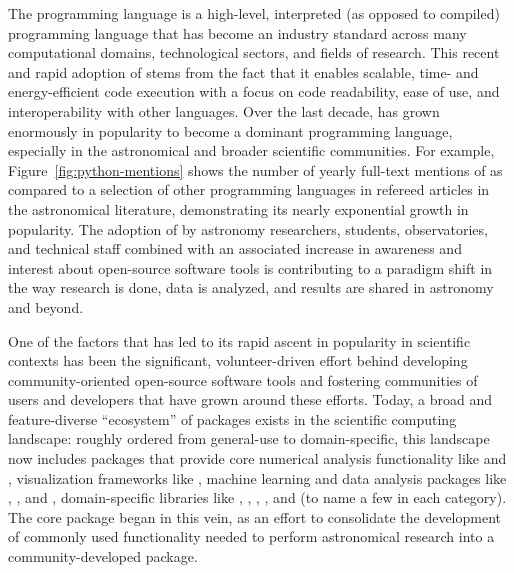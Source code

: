 \documentclass[modern]{aastex631}
\newcommand{\secauthor}[1]{{\color{blue}Author:~\textit{#1}}}
\begin{document}

The \python programming language is a high-level, interpreted (as opposed to
compiled) programming language that has become an industry standard across many
computational domains, technological sectors, and fields of research.
This recent and rapid adoption of \python stems from the fact that it enables
scalable, time- and energy-efficient code execution \citep[e.g.,][]{Augier:2021}
with a focus on code readability, ease of use, and interoperability with other
languages.
Over the last decade, \python has grown enormously in popularity to become a
dominant programming language, especially in the astronomical and broader scientific
communities.
For example, Figure~\ref{fig:python-mentions} shows the number of yearly
full-text mentions of \python as compared to a selection of other programming languages
in refereed articles in the astronomical literature, demonstrating its nearly
exponential growth in popularity.
The adoption of \python by astronomy researchers, students, observatories, and
technical staff combined with an associated increase in awareness and interest
about open-source software tools is contributing to a paradigm shift in the way
research is done, data is analyzed, and results are shared in astronomy and
beyond.

One of the factors that has led to its rapid ascent in popularity in scientific
contexts has been the significant, volunteer-driven effort behind developing
community-oriented open-source software tools and fostering communities of users
and developers that have grown around these efforts.
Today, a broad and feature-diverse ``ecosystem'' of packages exists in the
\python scientific computing landscape: roughly ordered from general-use to
domain-specific, this landscape now includes packages that provide core
numerical analysis functionality like  \citep{numpy:nature} and
 \citep{scipy}, visualization frameworks like
 \citep{matplotlib}, machine learning and data analysis
packages like  \citep{tensorflow}, 
\citep{Salvatier:2016}, and  \citep{emcee}, domain-specific
libraries like  \citep{yt:2011}, 
\citep{plasmapy},  \citep{sunpy:apj}, 
\citep{biopython}, and  \citep{sympy} (to name a few in each
category).
The \astropypkg \citep{astropy:2013, astropy:2018} core package began in this
vein, as an effort to consolidate the development of commonly used functionality
needed to perform astronomical research into a community-developed \python
package.
\end{document}
